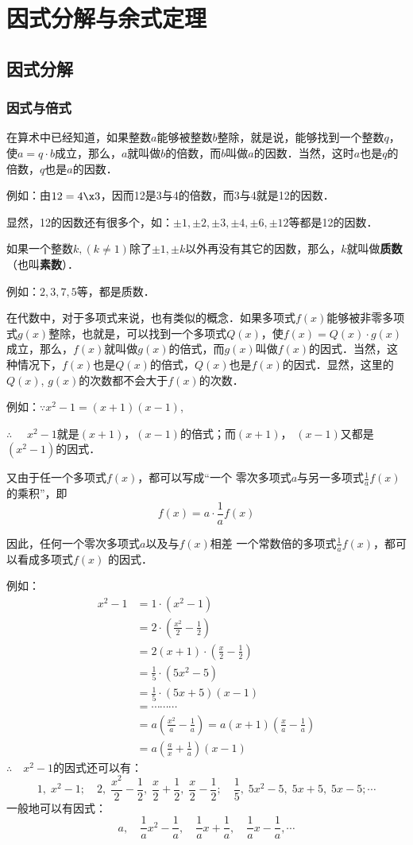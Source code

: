 \chapter{因式分解与余式定理}
\section{因式分解}
\subsection{因式与倍式}

在算术中已经知道，如果整数$a$能够被整数$b$整除，就是说，能够找到一个整数$q$，使$a=q\cdot b$成立，那么，$a$就叫做$b$的倍数，而$b$叫做$a$的因数．当然，这时$a$也是$q$的倍数，$q$也是$a$的因数．

例如：由$12=4\x3$，因而12是3与4的倍数，而3与4就是12的因数．

显然，12的因数还有很多个，如：$\pm1,\pm2,\pm3,\pm4,\pm6,\pm12$等都是12的因数．

如果一个整数$k, (k\ne 1)$除了$\pm1,\pm k$以外再没有其它的因数，那么，$k$就叫做\textbf{质数}（也叫\textbf{素数}）．

例如：$2, 3, 7, 5$等，都是质数．

在代数中，对于多项式来说，也有类似的概念．如果多项式$f(x)$能够被非零多项式$g(x)$整除，也就是，可以找到一个多项式$Q(x)$，使$f(x)=Q(x)\cdot g(x)$成立，那么，$f(x)$就叫做$g(x)$的倍式，而$g(x)$叫做$f(x)$的因式．当然，这种情况下，$f(x)$也是$Q(x)$的倍式，$Q(x)$也是$f(x)$的因式．显然，这里的$Q(x)$, $g(x)$的次数都不会大于$f(x)$的次数．

例如：$\because x^2-1=(x+1)(x-1)$,

$\therefore\quad $ $x^2-1$就是$(x+1)$，$(x-1)$的倍式；而$(x+1)$，
$(x-1)$又都是$(x^2-1)$的因式．

又由于任一个多项式$f(x)$，都可以写成“一个
零次多项式$a$与另一多项式$\frac{1}{a}f(x)$的乘积”，即
\[f(x)=a\cdot \frac{1}{a}f(x)\]

因此，任何一个零次多项式$a$以及与$f(x)$相差
一个常数倍的多项式$\frac{1}{a}f(x)$，都可以看成多项式$f(x)$
的因式．

例如：\[\begin{split}
x^2-1&= 1\cdot (x^2-1)\\
&=2\cdot \left(\frac{x^2}{2}-\frac{1}{2}\right)\\    
&=2(x+1)\cdot \left(\frac{x}{2}-\frac{1}{2}\right)\\
&=\frac{1}{5}\cdot (5x^2-5)\\
&=\frac{1}{5}\cdot (5x+5)(x-1)\\
&=\cdots \cdots \cdots \\
&=a\left(\frac{x^2}{a}-\frac{1}{a}\right)=a(x+1)\left(\frac{x}{a}-\frac{1}{a}\right)\\
&=a\left(\frac{a}{x}+\frac{1}{a}\right)(x-1)
\end{split}\]
$\therefore\quad x^2-1$的因式还可以有：
\[1,\; x^2-1;\quad 2,\; \frac{x^2}{2}-\frac{1}{2},\; \frac{x}{2}+\frac{1}{2},\; \frac{x}{2}-\frac{1}{2};\quad \frac{1}{5},\; 5x^2-5,\; 5x+5,\; 5x-5; \cdots \]
一般地可以有因式：
\[a,\quad \frac{1}{a}x^2-\frac{1}{a},\quad \frac{1}{a}x+\frac{1}{a},\quad \frac{1}{a}x-\frac{1}{a},\cdots\]

